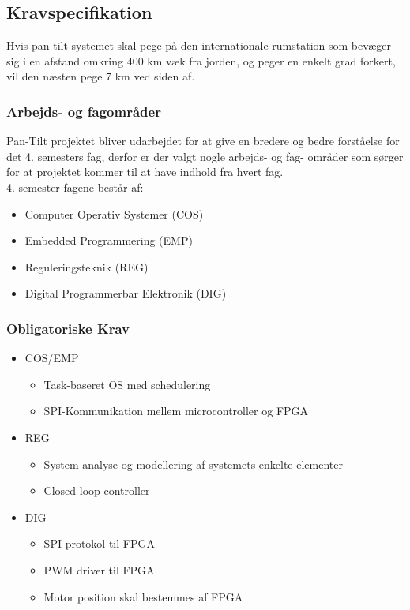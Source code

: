 
\subsection{Kravspecifikation}

Hvis pan-tilt systemet skal pege på den internationale rumstation som bevæger sig i en afstand omkring 400 km væk fra jorden, og peger en enkelt grad forkert, vil den næsten pege 7 km ved siden af.



\subsubsection{Arbejds- og fagområder}
Pan-Tilt projektet bliver udarbejdet for at give en bredere og bedre forståelse for det 4. semesters fag, derfor er der valgt nogle arbejds- og fag- områder som sørger for at projektet kommer til at have indhold fra hvert fag.\\
4. semester fagene består af:
\begin{itemize}[noitemsep]
	\item Computer Operativ Systemer (COS)
	\item Embedded Programmering (EMP)
	\item Reguleringsteknik (REG)
	\item Digital Programmerbar Elektronik (DIG)
\end{itemize}

\subsubsection{Obligatoriske Krav}

\begin{itemize}[noitemsep]
	\item COS/EMP
	\begin{itemize}[noitemsep]
		\item Task-baseret OS med schedulering
		\item SPI-Kommunikation mellem microcontroller og FPGA
	\end{itemize}
	\item REG
	\begin{itemize}[noitemsep]
		\item System analyse og modellering af systemets enkelte elementer
		\item Closed-loop controller
	\end{itemize}
	\item DIG
	\begin{itemize}[noitemsep]
		\item SPI-protokol til FPGA
		\item PWM driver til FPGA
		\item Motor position skal bestemmes af FPGA
	\end{itemize}
\end{itemize}


